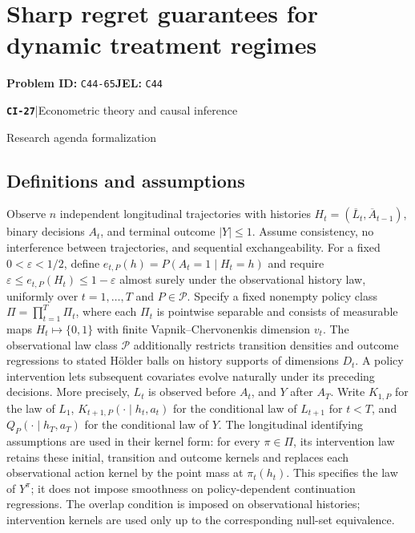 \documentclass[11pt,a4paper]{article}
\newcommand{\entrymeta}[3]{{\sffamily\small\color{muted}\textbf{\texttt{#1}}\quad|\quad #2\par #3\par}}
\begin{document}
\section*{Sharp regret guarantees for dynamic treatment regimes}
\textbf{Problem ID:} \texttt{C44-65}\quad \textbf{JEL:} \texttt{C44}\par
\label{problem:OP-0506}
\label{beyond:CI-27}
\entrymeta{CI-27}{Econometric theory and causal inference}{Research agenda formalization}
\subsection*{Definitions and assumptions}
Observe $n$ independent longitudinal trajectories with histories $H_t=(\overline L_t,\overline A_{t-1})$, binary decisions $A_t$, and terminal outcome $|Y|\leq1$. Assume consistency, no interference between trajectories, and sequential exchangeability. For a fixed $0<\varepsilon<1/2$, define $e_{t,P}(h)=P(A_t=1\mid H_t=h)$ and require $\varepsilon\leq e_{t,P}(H_t)\leq1-\varepsilon$ almost surely under the observational history law, uniformly over $t=1,\ldots,T$ and $P\in\mathcal P$. Specify a fixed nonempty policy class $\Pi=\prod_{t=1}^T\Pi_t$, where each $\Pi_t$ is pointwise separable and consists of measurable maps $H_t\mapsto\{0,1\}$ with finite Vapnik--Chervonenkis dimension $v_t$. The observational law class $\mathcal P$ additionally restricts transition densities and outcome regressions to stated H\"older balls on history supports of dimensions $D_t$. A policy intervention lets subsequent covariates evolve naturally under its preceding decisions. More precisely, $L_t$ is observed before $A_t$, and $Y$ after $A_T$. Write $K_{1,P}$ for the law of $L_1$, $K_{t+1,P}(\cdot\mid h_t,a_t)$ for the conditional law of $L_{t+1}$ for $t<T$, and $Q_P(\cdot\mid h_T,a_T)$ for the conditional law of $Y$. The longitudinal identifying assumptions are used in their kernel form: for every $\pi\in\Pi$, its intervention law retains these initial, transition and outcome kernels and replaces each observational action kernel by the point mass at $\pi_t(h_t)$. This specifies the law of $Y^\pi$; it does not impose smoothness on policy-dependent continuation regressions. The overlap condition is imposed on observational histories; intervention kernels are used only up to the corresponding null-set equivalence.
\end{document}

